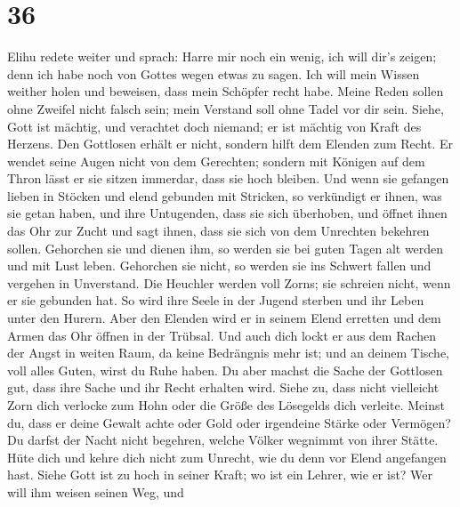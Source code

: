 \hypertarget{section-35}{%
\section{36}\label{section-35}}

 Elihu redete weiter und sprach:  Harre mir
noch ein wenig, ich will dir's zeigen; denn ich habe noch von Gottes
wegen etwas zu sagen.  Ich will mein Wissen weither holen
und beweisen, dass mein Schöpfer recht habe.  Meine Reden
sollen ohne Zweifel nicht falsch sein; mein Verstand soll ohne Tadel vor
dir sein.  Siehe, Gott ist mächtig, und verachtet doch
niemand; er ist mächtig von Kraft des Herzens.  Den
Gottlosen erhält er nicht, sondern hilft dem Elenden zum Recht.
 Er wendet seine Augen nicht von dem Gerechten; sondern
mit Königen auf dem Thron lässt er sie sitzen immerdar, dass sie hoch
bleiben.  Und wenn sie gefangen lieben in Stöcken und
elend gebunden mit Stricken,  so verkündigt er ihnen, was
sie getan haben, und ihre Untugenden, dass sie sich überhoben,
 und öffnet ihnen das Ohr zur Zucht und sagt ihnen, dass
sie sich von dem Unrechten bekehren sollen.  Gehorchen
sie und dienen ihm, so werden sie bei guten Tagen alt werden und mit
Lust leben.  Gehorchen sie nicht, so werden sie ins
Schwert fallen und vergehen in Unverstand.  Die Heuchler
werden voll Zorns; sie schreien nicht, wenn er sie gebunden hat.
 So wird ihre Seele in der Jugend sterben und ihr Leben
unter den Hurern.  Aber den Elenden wird er in seinem
Elend erretten und dem Armen das Ohr öffnen in der Trübsal.
 Und auch dich lockt er aus dem Rachen der Angst in
weiten Raum, da keine Bedrängnis mehr ist; und an deinem Tische, voll
alles Guten, wirst du Ruhe haben.  Du aber machst die
Sache der Gottlosen gut, dass ihre Sache und ihr Recht erhalten wird.
 Siehe zu, dass nicht vielleicht Zorn dich verlocke zum
Hohn oder die Größe des Lösegelds dich verleite.  Meinst
du, dass er deine Gewalt achte oder Gold oder irgendeine Stärke oder
Vermögen?  Du darfst der Nacht nicht begehren, welche
Völker wegnimmt von ihrer Stätte.  Hüte dich und kehre
dich nicht zum Unrecht, wie du denn vor Elend angefangen hast.
 Siehe Gott ist zu hoch in seiner Kraft; wo ist ein
Lehrer, wie er ist?  Wer will ihm weisen seinen Weg, und
